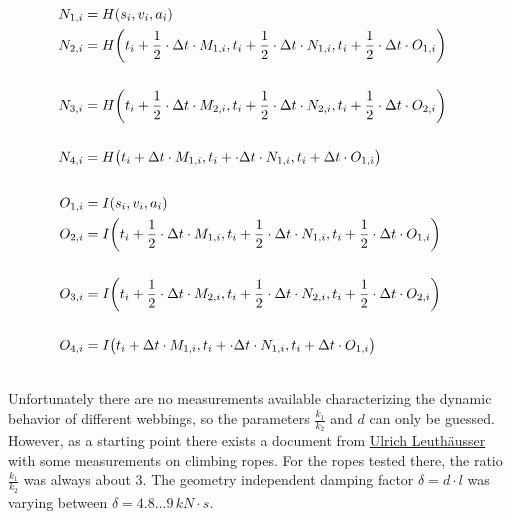 \begin{align}
N_{1,i} &= H(s_i, v_i, a_i) \\
N_{2,i} &\begin{multlined}[t]= H \biggl(t_i + \frac{1}{2} \cdot \Delta t \cdot M_{1,i}, t_i + \frac{1}{2} \cdot \Delta t \cdot N_{1,i}, t_i + \insertForSmartphone{\\} \frac{1}{2} \cdot \Delta t \cdot O_{1,i}\biggr)\\ \end{multlined} \\
N_{3,i} &\begin{multlined}[t]= H \biggl(t_i + \frac{1}{2} \cdot \Delta t \cdot M_{2,i}, t_i + \frac{1}{2} \cdot \Delta t \cdot N_{2,i}, t_i + \insertForSmartphone{\\} \frac{1}{2} \cdot \Delta t \cdot O_{2,i}\biggr)\\ \end{multlined} \\
N_{4,i} &\begin{multlined}[t]= H \bigl(t_i + \Delta t \cdot M_{1,i}, t_i + \cdot \Delta t \cdot N_{1,i}, t_i + \insertForSmartphone{\\} \Delta t \cdot O_{1,i}\bigr)\\ \end{multlined}
\end{align}
\begin{align}
O_{1,i} &= I (s_i, v_i, a_i) \\
O_{2,i} &\begin{multlined}[t]= I \biggl(t_i + \frac{1}{2} \cdot \Delta t \cdot M_{1,i}, t_i + \frac{1}{2} \cdot \Delta t \cdot N_{1,i}, t_i + \insertForSmartphone{\\} \frac{1}{2} \cdot \Delta t \cdot O_{1,i}\biggr)\ \\ \end{multlined} \\
O_{3,i} &\begin{multlined}[t]= I \biggl(t_i + \frac{1}{2} \cdot \Delta t \cdot M_{2,i}, t_i + \frac{1}{2} \cdot \Delta t \cdot N_{2,i}, t_i + \insertForSmartphone{\\} \frac{1}{2} \cdot \Delta t \cdot O_{2,i}\biggr)\\ \end{multlined} \\
O_{4,i} &\begin{multlined}[t]= I \bigl(t_i +  \Delta t \cdot M_{1,i}, t_i + \cdot \Delta t \cdot N_{1,i}, t_i + \insertForSmartphone{\\} \Delta t \cdot O_{1,i}\bigr)\\ \end{multlined}
\end{align}


Unfortunately there are no measurements available characterizing the dynamic behavior of different webbings, so the parameters $\frac{k_1}{k_2}$ and $d$ can only be guessed. However, as a starting point there exists a document from \href{http://www.sigmadewe.com/fileadmin/user\_upload/pdf-Dateien/SEILPHYSIK.pdf}{Ulrich Leuthäusser} with some measurements on climbing ropes.
For the ropes tested there, the ratio $\frac{k_1}{k_2}$ was always about $3$. The geometry independent damping factor $\delta = d \cdot l$ was varying between $\delta = 4.8 \dots 9\,kN\cdot s$.
